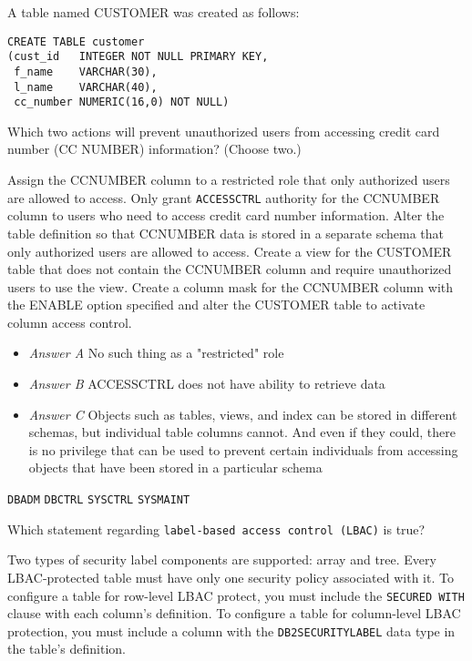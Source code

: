 \documentclass[answers, 11pt]{exam}
\begin{document}
\begin{questions}
\question[1]
A table named CUSTOMER was created as follows:
\begin{verbatim}
CREATE TABLE customer
(cust_id   INTEGER NOT NULL PRIMARY KEY,
 f_name    VARCHAR(30),
 l_name    VARCHAR(40),
 cc_number NUMERIC(16,0) NOT NULL)
\end{verbatim}
Which two actions will prevent unauthorized users from accessing credit card number (CC\textunderscore 
NUMBER) information? (Choose two.)
\begin{choices}
\choice Assign the CC\textunderscore NUMBER column to a restricted role that only authorized users
are allowed to access.
\choice Only grant \texttt{ACCESSCTRL} authority for the CC\textunderscore NUMBER column to users who
need to access credit card number information.
\choice Alter the table definition so that CC\textunderscore NUMBER data is stored in a separate schema
that only authorized users are allowed to access.
\CorrectChoice Create a view for the CUSTOMER table that does not contain the CC\textunderscore NUMBER column
and require unauthorized users to use the view.
\CorrectChoice Create a column mask for the CC\textunderscore NUMBER column with the ENABLE option specified and 
alter the CUSTOMER table to activate column access control.
\end{choices}

\begin{solution}
\begin{itemize}
\item \textit{Answer A} No such thing as a "restricted" role
\item \textit{Answer B} ACCESSCTRL does not have ability to retrieve data
\item \textit{Answer C} Objects such as tables, views, and index can be stored in different schemas, but 
individual table columns cannot. And even if they could, there is no privilege that can be used to 
prevent certain individuals from accessing objects that have been stored in a particular schema
\end{itemize}
\end{solution}

\begin{choices}
\choice \texttt{DBADM}
\choice \texttt{DBCTRL}
\CorrectChoice \texttt{SYSCTRL}
\choice \texttt{SYSMAINT}
\end{choices}

\newpage

\question[1]
Which statement regarding \texttt{label-based access control (LBAC)} is true?
\begin{choices}
\choice Two types of security label components are supported: array and tree.
\CorrectChoice Every LBAC-protected table must have only one security policy associated with it.
\choice To configure a table for row-level LBAC protect, you must include the \texttt{SECURED WITH}
clause with each column's definition.
\choice To configure a table for column-level LBAC protection, you must include a column with the
\texttt{DB2SECURITYLABEL} data type in the table's definition.
\end{choices}


\end{questions}
\end{document}
